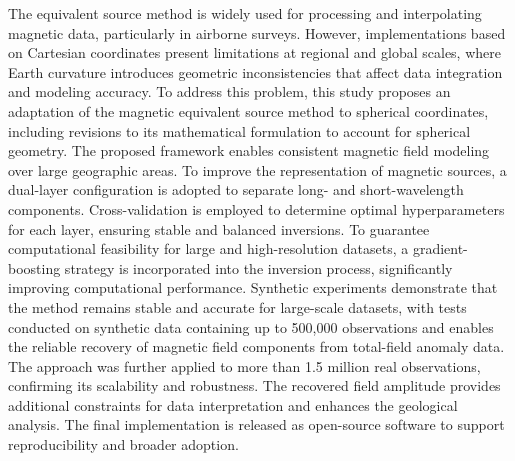 The equivalent source method is widely used for processing and
interpolating magnetic data, particularly in airborne surveys. However,
implementations based on Cartesian coordinates present limitations at
regional and global scales, where Earth curvature introduces geometric
inconsistencies that affect data integration and modeling accuracy. To
address this problem, this study proposes an adaptation of the magnetic
equivalent source method to spherical coordinates, including revisions
to its mathematical formulation to account for spherical geometry. The
proposed framework enables consistent magnetic field modeling over large
geographic areas.
To improve the representation of magnetic sources, a dual-layer
configuration is adopted to separate long- and short-wavelength
components. Cross-validation is employed to determine optimal
hyperparameters for each layer, ensuring stable and balanced inversions.
To guarantee computational feasibility for large and high-resolution
datasets, a gradient-boosting strategy is incorporated into the inversion
process, significantly improving computational performance.
Synthetic experiments demonstrate that the method remains stable and accurate for large-scale datasets, 
with tests conducted on synthetic data containing up to 500,000 observations and enables
the reliable recovery of magnetic field components from total-field
anomaly data. The approach was further applied to more than 1.5 million
real observations, confirming its scalability and robustness. The
recovered field amplitude provides additional constraints for data
interpretation and enhances the geological analysis.
The final implementation is released as open-source software to support
reproducibility and broader adoption.